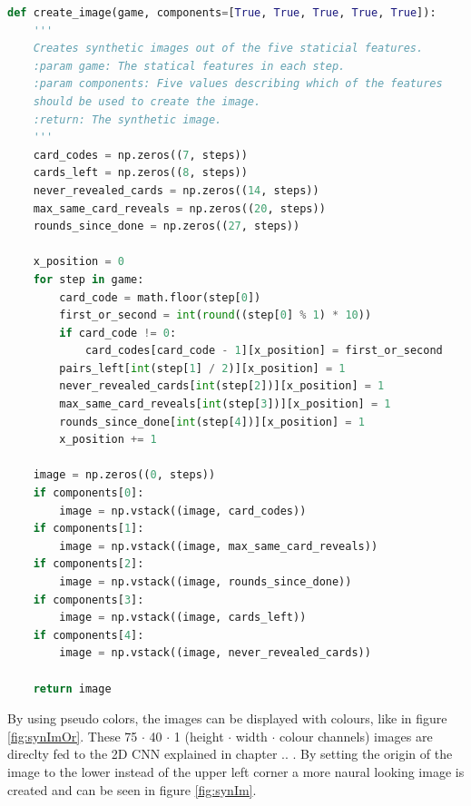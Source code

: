\begin{lstlisting}[language=python, caption=Add caption]
def create_image(game, components=[True, True, True, True, True]):
	'''
	Creates synthetic images out of the five staticial features.
	:param game: The statical features in each step. 
	:param components: Five values describing which of the features 
	should be used to create the image. 
	:return: The synthetic image.
	'''
	card_codes = np.zeros((7, steps))
	cards_left = np.zeros((8, steps))
	never_revealed_cards = np.zeros((14, steps))
	max_same_card_reveals = np.zeros((20, steps))
	rounds_since_done = np.zeros((27, steps))
	
	x_position = 0
	for step in game:
		card_code = math.floor(step[0])
		first_or_second = int(round((step[0] % 1) * 10))
		if card_code != 0:
			card_codes[card_code - 1][x_position] = first_or_second 
		pairs_left[int(step[1] / 2)][x_position] = 1
		never_revealed_cards[int(step[2])][x_position] = 1
		max_same_card_reveals[int(step[3])][x_position] = 1
		rounds_since_done[int(step[4])][x_position] = 1
		x_position += 1
	
	image = np.zeros((0, steps))
	if components[0]:   
		image = np.vstack((image, card_codes))
	if components[1]:
		image = np.vstack((image, max_same_card_reveals))
	if components[2]:  
		image = np.vstack((image, rounds_since_done))
	if components[3]:
		image = np.vstack((image, cards_left))
	if components[4]:   
		image = np.vstack((image, never_revealed_cards))
	
	return image
\end{lstlisting}

By using pseudo colors, the images can be displayed with colours, like in figure \ref{fig:synImOr}. These 75 $\cdot$ 40 $\cdot$ 1 (height $\cdot$ width $\cdot$ colour channels) images are direclty fed to the 2D CNN explained in chapter .. . By setting the origin of the image to the lower instead of the upper left corner a more naural looking image is created and can be seen in figure \ref{fig:synIm}. 

